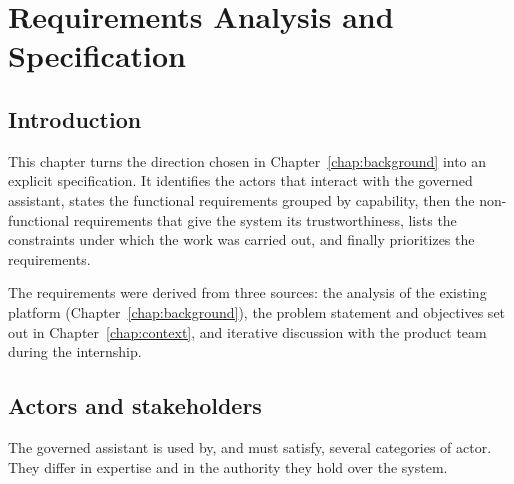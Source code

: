 \chapter{Requirements Analysis and Specification}
\label{chap:requirements}

\section*{Introduction}

This chapter turns the direction chosen in Chapter~\ref{chap:background} into an
explicit specification. It identifies the actors that interact with the governed
assistant, states the functional requirements grouped by capability, then the
non-functional requirements that give the system its trustworthiness, lists the
constraints under which the work was carried out, and finally prioritizes the
requirements.

The requirements were derived from three sources: the analysis of the existing
platform (Chapter~\ref{chap:background}), the problem statement and objectives
set out in Chapter~\ref{chap:context}, and iterative discussion with the product
team during the internship.

\section{Actors and stakeholders}
\label{sec:actors}

The governed assistant is used by, and must satisfy, several categories of
actor. They differ in expertise and in the authority they hold over the system.


